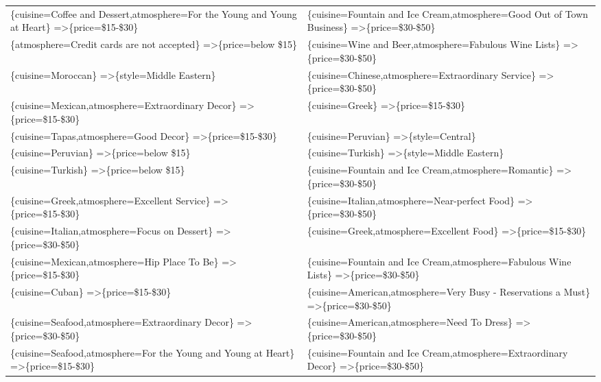 \documentclass[letterpaper,10pt]{article}
\begin{document}
\begin{appendices}
\begin{table}[h]
\begin{adjustbox}{max width=\textwidth}
\begin{tabular}{ll}
\{cuisine=Coffee and Dessert,atmosphere=For the Young and Young at Heart\} =\textgreater \{price=\$15-\$30\} & \{cuisine=Fountain and Ice Cream,atmosphere=Good Out of Town Business\} =\textgreater \{price=\$30-\$50\} \\
\{atmosphere=Credit cards are not accepted\} =\textgreater \{price=below \$15\} & \{cuisine=Wine and Beer,atmosphere=Fabulous Wine Lists\} =\textgreater \{price=\$30-\$50\} \\
\{cuisine=Moroccan\} =\textgreater \{style=Middle Eastern\} & \{cuisine=Chinese,atmosphere=Extraordinary Service\} =\textgreater \{price=\$30-\$50\} \\
\{cuisine=Mexican,atmosphere=Extraordinary Decor\} =\textgreater \{price=\$15-\$30\} & \{cuisine=Greek\} =\textgreater \{price=\$15-\$30\} \\
\{cuisine=Tapas,atmosphere=Good Decor\} =\textgreater \{price=\$15-\$30\} & \{cuisine=Peruvian\} =\textgreater \{style=Central\} \\
\{cuisine=Peruvian\} =\textgreater \{price=below \$15\} & \{cuisine=Turkish\} =\textgreater \{style=Middle Eastern\} \\
\{cuisine=Turkish\} =\textgreater \{price=below \$15\} & \{cuisine=Fountain and Ice Cream,atmosphere=Romantic\} =\textgreater \{price=\$30-\$50\} \\
\{cuisine=Greek,atmosphere=Excellent Service\} =\textgreater \{price=\$15-\$30\} & \{cuisine=Italian,atmosphere=Near-perfect Food\} =\textgreater \{price=\$30-\$50\} \\
\{cuisine=Italian,atmosphere=Focus on Dessert\} =\textgreater \{price=\$30-\$50\} & \{cuisine=Greek,atmosphere=Excellent Food\} =\textgreater \{price=\$15-\$30\} \\
\{cuisine=Mexican,atmosphere=Hip Place To Be\} =\textgreater \{price=\$15-\$30\} & \{cuisine=Fountain and Ice Cream,atmosphere=Fabulous Wine Lists\} =\textgreater \{price=\$30-\$50\} \\
\{cuisine=Cuban\} =\textgreater \{price=\$15-\$30\} & \{cuisine=American,atmosphere=Very Busy - Reservations a Must\} =\textgreater \{price=\$30-\$50\} \\
\{cuisine=Seafood,atmosphere=Extraordinary Decor\} =\textgreater \{price=\$30-\$50\} & \{cuisine=American,atmosphere=Need To Dress\} =\textgreater \{price=\$30-\$50\} \\
\{cuisine=Seafood,atmosphere=For the Young and Young at Heart\} =\textgreater \{price=\$15-\$30\} & \{cuisine=Fountain and Ice Cream,atmosphere=Extraordinary Decor\} =\textgreater \{price=\$30-\$50\} \\

\end{tabular}
\end{adjustbox}
\end{table}
\end{appendices}
\end{document}
